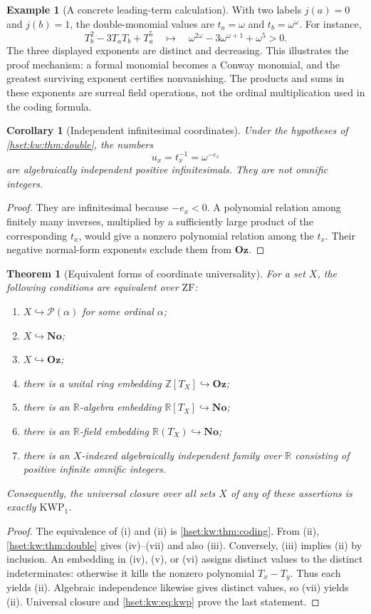 \documentclass[11pt,letterpaper]{article}
\newtheorem{theorem}{Theorem}[section]
\newtheorem{corollary}[corollary]{Corollary}\aliascntresetthe{corollary}
\theoremstyle{definition}
\newtheorem{example}[example]{Example}\aliascntresetthe{example}
\theoremstyle{remark}
\newcommand{\No}{\mathbf{No}}
\newcommand{\Pow}{\mathcal P}
\newcommand{\ZF}{\mathrm{ZF}}
\newcommand{\KWP}{\mathrm{KWP}}
\newcommand{\Oz}{\mathbf{Oz}}
\newcommand{\R}{\mathbb R}
\newcommand{\Z}{\mathbb Z}
\begin{document}
\begin{example}[A concrete leading-term calculation]
With two labels $j(a)=0$ and $j(b)=1$, the double-monomial values are
$t_a=\omega$ and $t_b=\omega^\omega$. For instance,
\[
T_b^2-3T_aT_b+T_a^5
\quad\longmapsto\quad
\omega^{2\omega}-3\omega^{\omega+1}+\omega^5>0.
\]
The three displayed exponents are distinct and decreasing. This illustrates the proof mechanism: a formal monomial becomes a Conway monomial, and the greatest surviving exponent certifies nonvanishing. The products and sums in these exponents are surreal field operations, not the ordinal multiplication used in the coding formula.
\end{example}

\begin{corollary}[Independent infinitesimal coordinates]\label{hset:kw:cor:infinitesimal}
Under the hypotheses of \cref{hset:kw:thm:double}, the numbers
\[
u_x=t_x^{-1}=\omega^{-e_x}
\]
are algebraically independent positive infinitesimals. They are not omnific integers.
\end{corollary}
\begin{proof}
They are infinitesimal because $-e_x<0$. A polynomial relation among finitely many inverses, multiplied by a sufficiently large product of the corresponding $t_x$, would give a nonzero polynomial relation among the $t_x$. Their negative normal-form exponents exclude them from $\Oz$.
\end{proof}

\begin{theorem}[Equivalent forms of coordinate universality]\label{hset:kw:thm:equivalences}
For a set $X$, the following conditions are equivalent over $\ZF$:
\begin{enumerate}[label=(\roman*)]
\item $X\hookrightarrow\Pow(\alpha)$ for some ordinal $\alpha$;
\item $X\hookrightarrow\No$;
\item $X\hookrightarrow\Oz$;
\item there is a unital ring embedding $\Z[T_X]\hookrightarrow\Oz$;
\item there is an $\R$-algebra embedding $\R[T_X]\hookrightarrow\No$;
\item there is an $\R$-field embedding $\R(T_X)\hookrightarrow\No$;
\item there is an $X$-indexed algebraically independent family over $\R$ consisting of positive infinite omnific integers.
\end{enumerate}
Consequently, the universal closure over all sets $X$ of any of these assertions is exactly $\KWP_1$.
\end{theorem}
\begin{proof}
The equivalence of (i) and (ii) is \cref{hset:kw:thm:coding}. From (ii), \cref{hset:kw:thm:double} gives (iv)--(vii) and also (iii). Conversely, (iii) implies (ii) by inclusion. An embedding in (iv), (v), or (vi) assigns distinct values to the distinct indeterminates: otherwise it kills the nonzero polynomial $T_x-T_y$. Thus each yields (ii). Algebraic independence likewise gives distinct values, so (vii) yields (ii). Universal closure and \eqref{hset:kw:eq:kwp} prove the last statement.
\end{proof}
\end{document}
